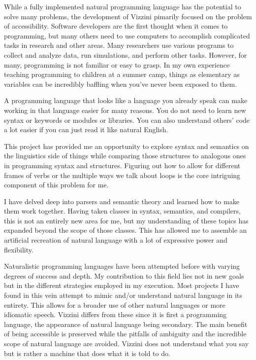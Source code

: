 \documentclass[titlepage]{article}
\newcommand{\langName}{Vizzini}
\begin{document}
While a fully implemented natural programming language has the potential to solve many problems, the development of \langName{} pimarily focused on the problem of accessibility. Software developers are the first thought when it comes to programming, but many others need to use computers to accomplish complicated tasks in research and other areas. Many researchers use various programs to collect and analyze data, run simulations, and perform other tasks. However, for many, programming is not familiar or easy to grasp. In my own experience teaching programming to children at a summer camp, things as elementary as variables can be incredibly baffling when you've never been exposed to them.

A programming language that looks like a language you already speak can make working in that language easier for many reasons. You do not need to learn new syntax or keywords or modules or libraries. You can also understand others' code a lot easier if you can just read it like natural English.

This project has provided me an opportunity to explore syntax and semantics on the linguistics side of things while comparing those structures to analogous ones in programming syntax and structures. Figuring out how to allow for different frames of verbs or the multiple ways we talk about loops is the core intriguing component of this problem for me.

I have delved deep into parsers and semantic theory and learned how to make them work together. Having taken classes in syntax, semantics, and compilers, this is not an entirely new area for me, but my understanding of these topics has expanded beyond the scope of those classes. This has allowed me to assemble an artificial recreation of natural language with a lot of expressive power and flexibility.

Naturalistic programming languages have been attempted before with varying degrees of success and depth. My contribution to this field lies not in new goals but in the different strategies employed in my execution. Most projects I have found in this vein attempt to mimic and/or understand natural language in its entirety. This allows for a broader use of other natural languages or more idiomatic speech. \langName{} differs from these since it is first a programming language, the appearance of natural language being secondary. The main benefit of being accessible is preserved while the pitfalls of ambiguity and the incredible scope of natural language are avoided. \langName{} does not understand what you say but is rather a machine that does what it is told to do.
\end{document}
